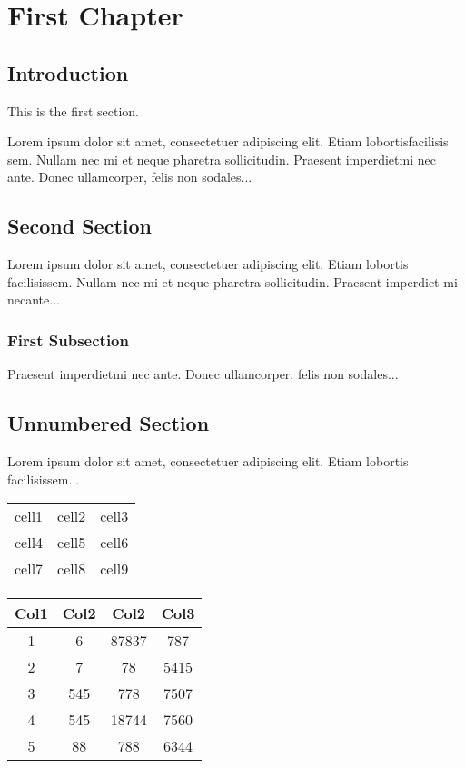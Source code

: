 \documentclass{book}
\begin{document}
\chapter{First Chapter}

\section{Introduction}

This is the first section.

Lorem  ipsum  dolor  sit  amet,  consectetuer  adipiscing
elit. Etiam  lobortisfacilisis sem.  Nullam nec mi et
neque pharetra sollicitudin.  Praesent imperdietmi nec ante.
Donec ullamcorper, felis non sodales...

\section{Second Section}

Lorem ipsum dolor sit amet, consectetuer adipiscing elit.
Etiam lobortis facilisissem.  Nullam nec mi et neque pharetra
sollicitudin.  Praesent imperdiet mi necante...

\subsection{First Subsection}
Praesent imperdietmi nec ante. Donec ullamcorper, felis non sodales...

\section*{Unnumbered Section}
Lorem ipsum dolor sit amet, consectetuer adipiscing elit.
Etiam lobortis facilisissem...

\begin{center}
    \begin{tabular}{|c|c|c|}
        \hline
        cell1 & cell2 & cell3 \\
        cell4 & cell5 & cell6 \\
        cell7 & cell8 & cell9 \\
        \hline
    \end{tabular}
\end{center}

\begin{center}
    \begin{tabular}{||c | c | c | c||}
        \hline
        Col1 & Col2 & Col2  & Col3 \\ [0.5ex]
        \hline\hline
        1    & 6    & 87837 & 787  \\
        \hline
        2    & 7    & 78    & 5415 \\
        \hline
        3    & 545  & 778   & 7507 \\
        \hline
        4    & 545  & 18744 & 7560 \\
        \hline
        5    & 88   & 788   & 6344 \\ [1ex]
        \hline
    \end{tabular}
\end{center}
\end{document}

